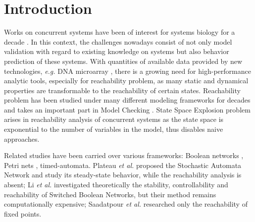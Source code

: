 \documentclass[runningheads]{llncs}
\begin{document}
\section{Introduction}
\label{intro}
Works on concurrent systems have been of interest for systems biology for a decade \cite{bockmayr2002using,bortolussi2008modeling,wiley2003computational}. 
In this context, the challenges nowadays consist of not only model validation with regard to existing knowledge on systems but also behavior prediction of these systems. 
With quantities of available data provided by new technologies, \textit{e.g.} DNA microarray \cite{marx2013}, there is a growing need for high-performance analytic tools, especially for reachability problem, as many static and dynamical properties are transformable to the reachability of certain states.
Reachability problem has been studied under many different modeling frameworks for decades \cite{akutsu2007control,barrett2006complexity,Daws1998,esparza1998,mayr1984,wozna2003} and takes an important part in Model Checking \cite{clarke2008birth,clarke20142}. 
State Space Explosion problem arises in reachability analysis of concurrent systems as the state space is exponential to the number of variables in the model, thus disables naive approaches. 

Related studies have been carried over various frameworks: Boolean networks \cite{akutsu2007control}, Petri nets \cite{mayr1984,esparza1998}, timed-automata\cite{Daws1998,wozna2003}. 
Plateau \textit{et al.} \cite{plateau1991stochastic} proposed the Stochastic Automata Network and study its steady-state behavior, while the reachability analysis is absent; 
Li \textit{et al.} \cite{li2012reachability,li2014stability} investigated theoretically the stability, controllability and reachability of Switched Boolean Networks, but their method remains computationally expensive;
Saadatpour \textit{et al.} \cite{saadatpour2010attractor} researched only the reachability of fixed points.
\end{document}
